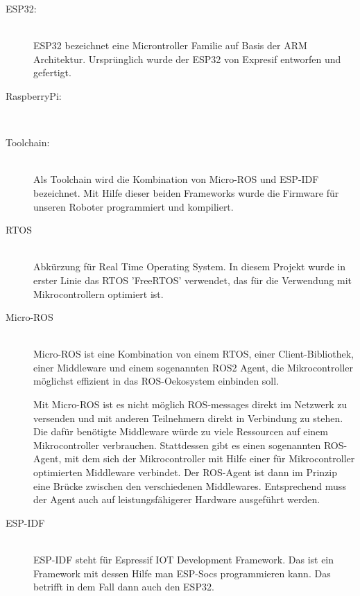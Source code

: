 \begin{flushleft}
\begin{description}
        \item[ESP32:]\hfill\\
        ESP32 bezeichnet eine Microntroller Familie auf Basis der ARM Architektur.
        Ursprünglich wurde der ESP32 von Expresif entworfen und gefertigt.

        \item[RaspberryPi:]\hfill\\
        
        \item[Toolchain:] \hfill\\
        Als Toolchain wird die Kombination von Micro-ROS und ESP-IDF bezeichnet.
        Mit Hilfe dieser beiden Frameworks wurde die Firmware für unseren Roboter programmiert und kompiliert.

        \item[RTOS]\hfill\\
        Abkürzung für Real Time Operating System. 
        In diesem Projekt wurde in erster Linie das RTOS 'FreeRTOS' verwendet, das für die Verwendung mit Mikrocontrollern optimiert ist.
        
        \item[Micro-ROS]\hfill\\
        Micro-ROS ist eine Kombination von einem RTOS, einer Client-Bibliothek, einer Middleware und einem sogenannten ROS2 Agent, 
        die Mikrocontroller möglichst effizient in das ROS-Oekosystem einbinden soll.
        
        Mit Micro-ROS ist es nicht möglich ROS-messages direkt im Netzwerk zu versenden und mit anderen Teilnehmern direkt in Verbindung zu stehen.
        Die dafür benötigte Middleware würde zu viele Ressourcen auf einem Mikrocontroller verbrauchen. 
        Stattdessen gibt es einen sogenannten ROS-Agent, mit dem sich der Mikrocontroller mit Hilfe einer für Mikrocontroller optimierten Middleware verbindet.
        Der ROS-Agent ist dann im Prinzip eine Brücke zwischen den verschiedenen Middlewares. Entsprechend muss der Agent auch auf leistungsfähigerer Hardware ausgeführt werden.    

        \item[ESP-IDF]\hfill\\
        ESP-IDF steht für Espressif IOT Development Framework. Das ist ein Framework mit dessen Hilfe man ESP-Socs programmieren kann.
        Das betrifft in dem Fall dann auch den ESP32.

        \end{description}
\end{flushleft}